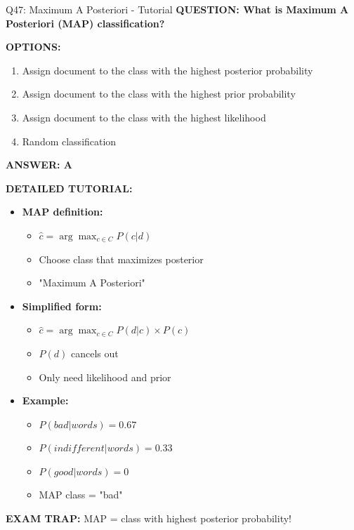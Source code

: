 \documentclass[8pt]{beamer}
\begin{document}
	\begin{frame}{Q47: Maximum A Posteriori - Tutorial}
		\fontsize{6.5}{7.5}\selectfont
		\textbf{QUESTION: What is Maximum A Posteriori (MAP) classification?}
		
		\vspace{0.1cm}
		\textbf{OPTIONS:}
		\begin{enumerate}
			\item Assign document to the class with the highest posterior probability
			\item Assign document to the class with the highest prior probability
			\item Assign document to the class with the highest likelihood
			\item Random classification
		\end{enumerate}
		
		\vspace{0.1cm}
		\textcolor{myblue}{\textbf{ANSWER: A}}
		
		\vspace{0.1cm}
		\textbf{DETAILED TUTORIAL:}
		\begin{itemize}
			\item \textbf{MAP definition:}
			\begin{itemize}
				\item $\hat{c} = \arg\max_{c \in C} P(c|d)$
				\item Choose class that maximizes posterior
				\item "Maximum A Posteriori"
			\end{itemize}
			\item \textbf{Simplified form:}
			\begin{itemize}
				\item $\hat{c} = \arg\max_{c \in C} P(d|c) \times P(c)$
				\item $P(d)$ cancels out
				\item Only need likelihood and prior
			\end{itemize}
			\item \textbf{Example:}
			\begin{itemize}
				\item $P(bad|words) = 0.67$
				\item $P(indifferent|words) = 0.33$
				\item $P(good|words) = 0$
				\item MAP class = "bad"
			\end{itemize}
		\end{itemize}
		
		\textcolor{myred}{\textbf{EXAM TRAP:}} MAP = \textcolor{myblue}{class with highest posterior probability}!
	\end{frame}
	
\end{document}

